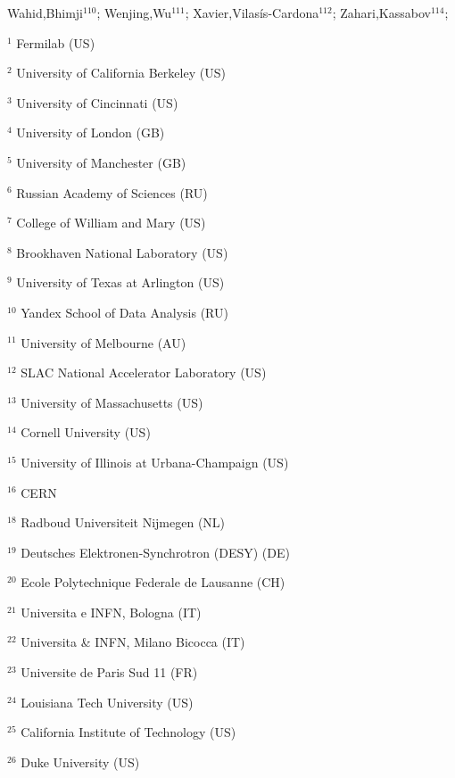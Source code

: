 Wahid,Bhimji$^{110}$;
Wenjing,Wu$^{111}$;
Xavier,Vilasís-Cardona$^{112}$;
Zahari,Kassabov$^{114}$;
\bigskip 
\par {\footnotesize $^{1}$ Fermilab (US)}
\par {\footnotesize $^{2}$ University of California Berkeley (US)}
\par {\footnotesize $^{3}$ University of Cincinnati (US)}
\par {\footnotesize $^{4}$ University of London (GB)}
\par {\footnotesize $^{5}$ University of Manchester (GB)}
\par {\footnotesize $^{6}$ Russian Academy of Sciences (RU)}
\par {\footnotesize $^{7}$ College of William and Mary (US)}
\par {\footnotesize $^{8}$ Brookhaven National Laboratory (US)}
\par {\footnotesize $^{9}$ University of Texas at Arlington (US)}
\par {\footnotesize $^{10}$ Yandex School of Data Analysis (RU)}
\par {\footnotesize $^{11}$ University of Melbourne (AU)}
\par {\footnotesize $^{12}$ SLAC National Accelerator  Laboratory (US)}
\par {\footnotesize $^{13}$ University of Massachusetts (US)}
\par {\footnotesize $^{14}$ Cornell University (US)}
\par {\footnotesize $^{15}$ University of Illinois at Urbana-Champaign (US)}
\par {\footnotesize $^{16}$ CERN}
\par {\footnotesize $^{18}$ Radboud Universiteit Nijmegen (NL)}
\par {\footnotesize $^{19}$ Deutsches Elektronen-Synchrotron (DESY) (DE)}
\par {\footnotesize $^{20}$ Ecole Polytechnique Federale de Lausanne (CH)}
\par {\footnotesize $^{21}$ Universita e INFN, Bologna (IT)}
\par {\footnotesize $^{22}$ Universita \& INFN, Milano Bicocca (IT)}
\par {\footnotesize $^{23}$ Universite de Paris Sud 11 (FR)}
\par {\footnotesize $^{24}$ Louisiana Tech University (US)}
\par {\footnotesize $^{25}$ California Institute of Technology (US)}
\par {\footnotesize $^{26}$ Duke University (US)}
